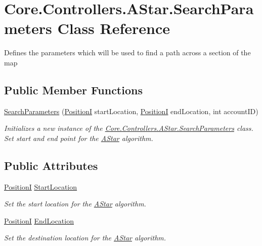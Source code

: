 \hypertarget{classCore_1_1Controllers_1_1AStar_1_1SearchParameters}{}\section{Core.\+Controllers.\+A\+Star.\+Search\+Parameters Class Reference}
\label{classCore_1_1Controllers_1_1AStar_1_1SearchParameters}


Defines the parameters which will be used to find a path across a section of the map  


\subsection*{Public Member Functions}
\begin{DoxyCompactItemize}
\item 
\hyperlink{classCore_1_1Controllers_1_1AStar_1_1SearchParameters_aeb9288b15209479b4219cbe2fd48b75c}{Search\+Parameters} (\hyperlink{classCore_1_1Models_1_1PositionI}{Position\+I} start\+Location, \hyperlink{classCore_1_1Models_1_1PositionI}{Position\+I} end\+Location, int account\+I\+D)
\begin{DoxyCompactList}\small\item\em Initializes a new instance of the \hyperlink{classCore_1_1Controllers_1_1AStar_1_1SearchParameters}{Core.\+Controllers.\+A\+Star.\+Search\+Parameters} class. Set start and end point for the \hyperlink{namespaceCore_1_1Controllers_1_1AStar}{A\+Star} algorithm. \end{DoxyCompactList}\end{DoxyCompactItemize}
\subsection*{Public Attributes}
\begin{DoxyCompactItemize}
\item 
\hyperlink{classCore_1_1Models_1_1PositionI}{Position\+I} \hyperlink{classCore_1_1Controllers_1_1AStar_1_1SearchParameters_a9addbcd3d571eb694d893e56984d5611}{Start\+Location}
\begin{DoxyCompactList}\small\item\em Set the start location for the \hyperlink{namespaceCore_1_1Controllers_1_1AStar}{A\+Star} algorithm. \end{DoxyCompactList}\item 
\hyperlink{classCore_1_1Models_1_1PositionI}{Position\+I} \hyperlink{classCore_1_1Controllers_1_1AStar_1_1SearchParameters_a651fd567bf737021f4213fa0caf608bc}{End\+Location}
\begin{DoxyCompactList}\small\item\em Set the destination location for the \hyperlink{namespaceCore_1_1Controllers_1_1AStar}{A\+Star} algorithm. \end{DoxyCompactList}\end{DoxyCompactItemize}
